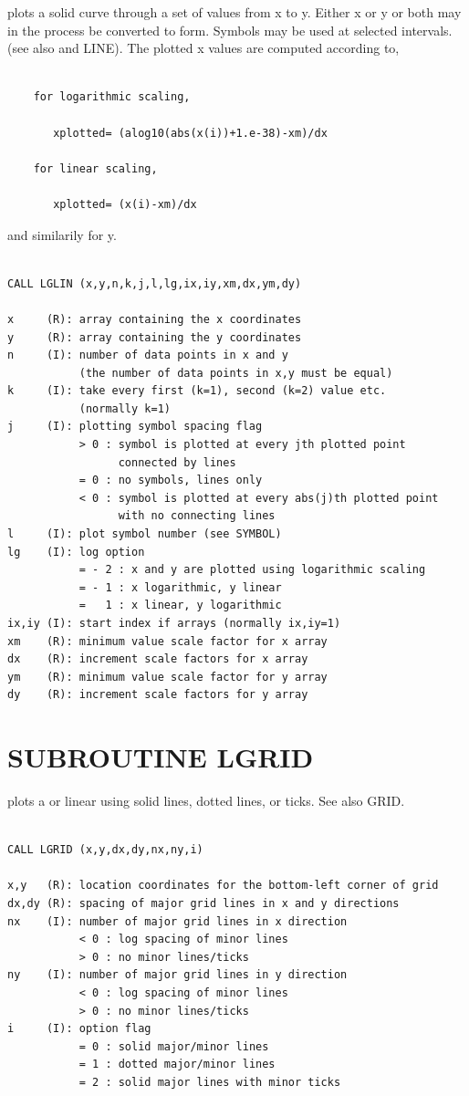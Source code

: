 \documentclass[11pt]{report}
\begin{document}
 plots a solid curve through a set of values from x to y.
Either x or y or both may in the process be converted to
 form.  Symbols may be used at selected intervals.
(see also  and LINE).  The plotted x values are computed according to,
\begin{verbatim}

    for logarithmic scaling,

       xplotted= (alog10(abs(x(i))+1.e-38)-xm)/dx

    for linear scaling,

       xplotted= (x(i)-xm)/dx

\end{verbatim}
and similarily for y.
\begin{verbatim}

CALL LGLIN (x,y,n,k,j,l,lg,ix,iy,xm,dx,ym,dy)

x     (R): array containing the x coordinates
y     (R): array containing the y coordinates
n     (I): number of data points in x and y
           (the number of data points in x,y must be equal)
k     (I): take every first (k=1), second (k=2) value etc.
           (normally k=1)
j     (I): plotting symbol spacing flag
           > 0 : symbol is plotted at every jth plotted point
                 connected by lines
           = 0 : no symbols, lines only
           < 0 : symbol is plotted at every abs(j)th plotted point
                 with no connecting lines
l     (I): plot symbol number (see SYMBOL)
lg    (I): log option
           = - 2 : x and y are plotted using logarithmic scaling
           = - 1 : x logarithmic, y linear
           =   1 : x linear, y logarithmic
ix,iy (I): start index if arrays (normally ix,iy=1)
xm    (R): minimum value scale factor for x array
dx    (R): increment scale factors for x array
ym    (R): minimum value scale factor for y array
dy    (R): increment scale factors for y array
\end{verbatim}

\section{SUBROUTINE  LGRID}

 plots a  or linear  using solid lines,
dotted lines, or ticks.  See also GRID.
\begin{verbatim}

CALL LGRID (x,y,dx,dy,nx,ny,i)

x,y   (R): location coordinates for the bottom-left corner of grid
dx,dy (R): spacing of major grid lines in x and y directions
nx    (I): number of major grid lines in x direction
           < 0 : log spacing of minor lines
           > 0 : no minor lines/ticks
ny    (I): number of major grid lines in y direction
           < 0 : log spacing of minor lines
           > 0 : no minor lines/ticks
i     (I): option flag
           = 0 : solid major/minor lines
           = 1 : dotted major/minor lines
           = 2 : solid major lines with minor ticks
\end{verbatim}
\end{document}
